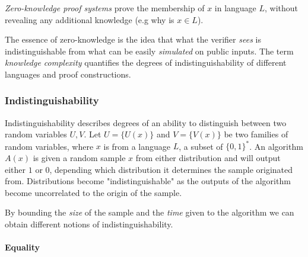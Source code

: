 \textit{Zero-knowledge proof systems} prove the  membership of $x$ in language $L$, without revealing any additional knowledge (e.g why is $x \in L$).

The essence of zero-knowledge is the idea that what the verifier \textit{sees} is indistinguishable from what can be easily \textit{simulated} on public inputs.
The term \textit{knowledge complexity} quantifies the degrees of indistinguishability of different languages and proof constructions. 

\subsubsection{Indistinguishability}
Indistinguishability describes degrees of an ability to distinguish between two random variables $U, V$.
\bigskip
\newline
Let $U = \{U(x)\}$ and $V = \{V(x)\}$ be two families of random variables, where $x$ is from a language $L$, a subset of $\{0, 1\}^*$.
\newline
An algorithm $A(x)$ is given a random sample $x$ from either distribution and will output either $1$ or $0$, depending which distribution it determines the sample originated from.
Distributions become "indistinguishable" as the outputs of the algorithm become uncorrelated to the origin of the sample.

By bounding the \textit{size} of the sample and the \textit{time} given to the algorithm we can obtain different notions of indistinguishability.

%
%
%


\paragraph{Equality} 

